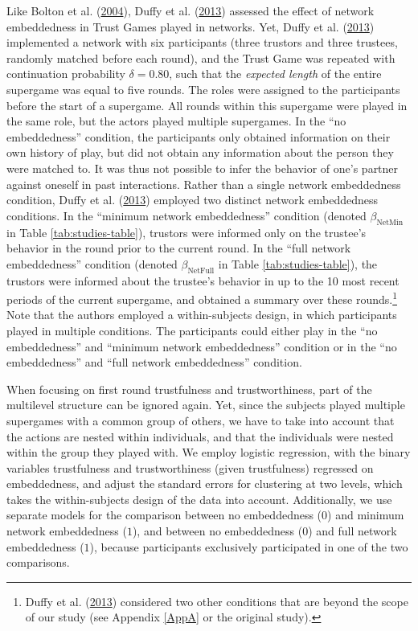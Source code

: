 \documentclass[
  11pt,
]{article}
\begin{document}
Like Bolton et al. (\protect\hyperlink{ref-bolton_electronic_2004}{2004}), Duffy et al. (\protect\hyperlink{ref-duffy2013social}{2013}) assessed the effect of network embeddedness in Trust Games played in networks.
Yet, Duffy et al. (\protect\hyperlink{ref-duffy2013social}{2013}) implemented a network with six participants (three trustors and three trustees, randomly matched before each round), and the Trust Game was repeated with continuation probability \(\delta = 0.80\), such that the \emph{expected length} of the entire supergame was equal to five rounds.
The roles were assigned to the participants before the start of a supergame.
All rounds within this supergame were played in the same role, but the actors played multiple supergames.
In the ``no embeddedness'' condition, the participants only obtained information on their own history of play, but did not obtain any information about the person they were matched to.
It was thus not possible to infer the behavior of one's partner against oneself in past interactions.
Rather than a single network embeddedness condition, Duffy et al. (\protect\hyperlink{ref-duffy2013social}{2013}) employed two distinct network embeddedness conditions.
In the ``minimum network embeddedness'' condition (denoted \(\beta_{\text{NetMin}}\) in Table \ref{tab:studies-table}), trustors were informed only on the trustee's behavior in the round prior to the current round.
In the ``full network embeddedness'' condition (denoted \(\beta_{\text{NetFull}}\) in Table \ref{tab:studies-table}), the trustors were informed about the trustee's behavior in up to the 10 most recent periods of the current supergame, and obtained a summary over these rounds.\footnote{Duffy et al. (\protect\hyperlink{ref-duffy2013social}{2013}) considered two other conditions that are beyond the scope of our study (see Appendix \ref{AppA} or the original study).}
Note that the authors employed a within-subjects design, in which participants played in multiple conditions.
The participants could either play in the ``no embeddedness'' and ``minimum network embeddedness'' condition or in the ``no embeddedness'' and ``full network embeddedness'' condition.

When focusing on first round trustfulness and trustworthiness, part of the multilevel structure can be ignored again.
Yet, since the subjects played multiple supergames with a common group of others, we have to take into account that the actions are nested within individuals, and that the individuals were nested within the group they played with.
We employ logistic regression, with the binary variables trustfulness and trustworthiness (given trustfulness) regressed on embeddedness, and adjust the standard errors for clustering at two levels, which takes the within-subjects design of the data into account.
Additionally, we use separate models for the comparison between no embeddedness (\(0\)) and minimum network embeddedness (\(1\)), and between no embeddedness (\(0\)) and full network embeddedness (\(1\)), because participants exclusively participated in one of the two comparisons.
\end{document}
